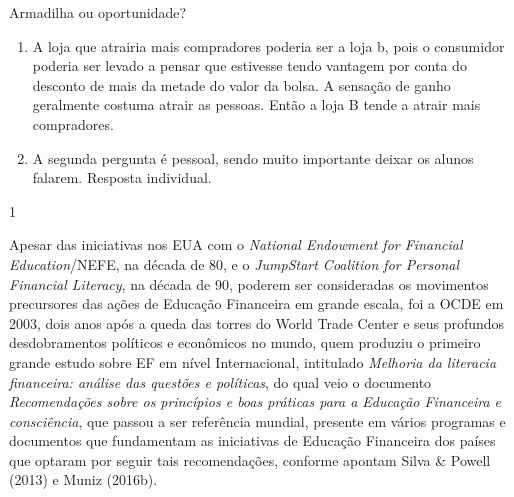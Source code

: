 \marginpar{\vspace{.05em}}
\begin{answer}{Armadilha ou oportunidade?}
{
\begin{enumerate}
\item A loja que atrairia mais compradores poderia ser a loja b, pois o consumidor poderia ser levado a pensar que estivesse tendo vantagem por conta do desconto de mais da metade do valor da bolsa. A sensação de ganho geralmente costuma atrair as pessoas. Então a loja B tende a atrair mais compradores. 

\item A segunda pergunta é pessoal, sendo muito importante deixar os alunos falarem. Resposta individual.

\end{enumerate}
}{1}
\end{answer}

\begin{knowledge}
Apesar das iniciativas nos EUA com o \textit{National Endowment for Financial Education}/NEFE, na década de 80, e o \textit{JumpStart Coalition for Personal Financial Literacy}, na década de 90, poderem ser consideradas os movimentos precursores das ações de Educação Financeira em grande escala, foi a OCDE em 2003, dois anos após a queda das torres do World Trade Center e seus profundos desdobramentos políticos e econômicos no mundo, quem produziu o primeiro grande estudo sobre EF em nível Internacional, intitulado \textit{Melhoria da literacia financeira: análise das questões e políticas}, do qual veio o documento \textit{Recomendações sobre os princípios e boas práticas para a Educação Financeira e consciência}, que passou a ser referência mundial, presente em vários programas e documentos que fundamentam as iniciativas de Educação Financeira dos países que optaram por seguir tais recomendações, conforme apontam Silva \& Powell (2013) e Muniz (2016b).
\end{knowledge}

